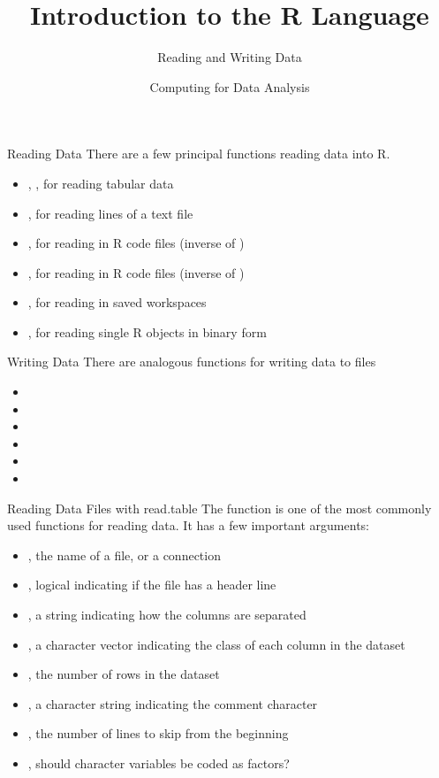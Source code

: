 \documentclass[aspectratio=169]{beamer}
\title[The R Language]{Introduction to the R Language}
\subtitle{Reading and Writing Data}
\date{Computing for Data Analysis}
\begin{document}
\begin{frame}
  \titlepage
\end{frame}



\begin{frame}{Reading Data}
There are a few principal functions reading data into R.
\begin{itemize}
\item
{}, , for reading tabular data
\item
{}, for reading lines of a text file
\item
{}, for reading in R code files (inverse of )
\item
{}, for reading in R code files (inverse of )
\item
{}, for reading in saved workspaces
\item
{}, for reading single R objects in binary form
\end{itemize}
\end{frame}


\begin{frame}{Writing Data}
There are analogous functions for writing data to files
\begin{itemize}
\item
{}
\item
{}
\item
{}
\item
{}
\item
{}
\item
{}
\end{itemize}
\end{frame}



\begin{frame}{Reading Data Files with read.table}
The  function is one of the most commonly used
functions for reading data.  It has a few important arguments:
\begin{itemize}
\item
{}, the name of a file, or a connection
\item
{}, logical indicating if the file has a header line
\item
{}, a string indicating how the columns are separated
\item
{}, a character vector indicating the class of each
column in the dataset
\item
{}, the number of rows in the dataset
\item
{}, a character string indicating the comment
character
\item
{}, the number of lines to skip from the beginning
\item
{}, should character variables be coded as
factors?
\end{itemize}
\end{frame}
\end{document}

